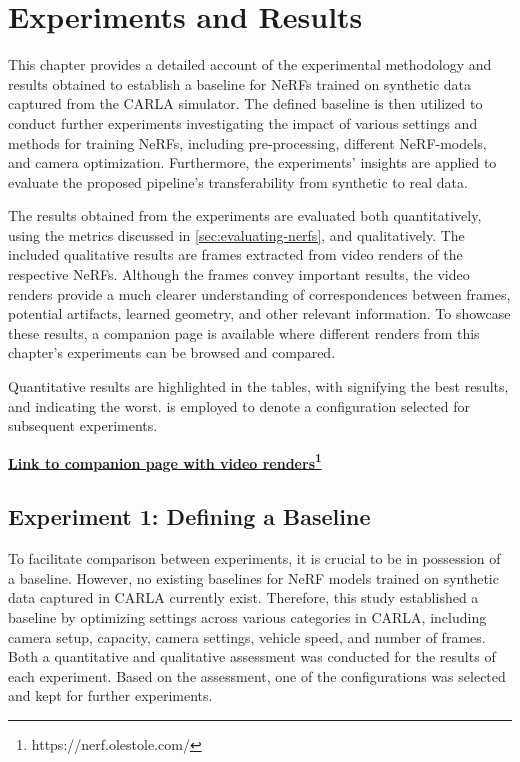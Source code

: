 \chapter{Experiments and Results} \label{sec:experiments-and-results}
This chapter provides a detailed account of the experimental methodology and results obtained to establish a baseline for NeRFs trained on synthetic data captured from the CARLA simulator. The defined baseline is then utilized to conduct further experiments investigating the impact of various settings and methods for training NeRFs, including pre-processing, different NeRF-models, and camera optimization. Furthermore, the experiments’ insights are applied to evaluate the proposed pipeline’s transferability from synthetic to real data.

The results obtained from the experiments are evaluated both quantitatively, using the metrics discussed in \autoref{sec:evaluating-nerfs}, and qualitatively. The included qualitative results are frames extracted from video renders of the respective NeRFs. Although the frames convey important results, the video renders provide a much clearer understanding of correspondences between frames, potential artifacts, learned geometry, and other relevant information. To showcase these results, a companion page is available where different renders from this chapter's experiments can be browsed and compared.

Quantitative results are highlighted in the tables, with  signifying the best results, and  indicating the worst.  is employed to denote a configuration selected for subsequent experiments.

\vspace{2mm} %
\noindent \textbf{\href{https://nerf.olestole.com/}{Link to companion page with video renders\footnote{\url{https://nerf.olestole.com/}}}}




\newpage
\section{Experiment 1: Defining a Baseline}

To facilitate comparison between experiments, it is crucial to be in possession of a baseline. However, no existing baselines for NeRF models trained on synthetic data captured in CARLA currently exist. Therefore, this study established a baseline by optimizing settings across various categories in CARLA, including camera setup, capacity, camera settings, vehicle speed, and number of frames. Both a quantitative and qualitative assessment was conducted for the results of each experiment. Based on the assessment, one of the configurations was selected and kept for further experiments.

